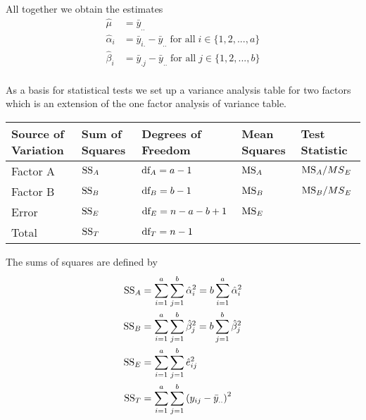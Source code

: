 All together we obtain the estimates
\begin{equation}
  \begin{split}
    \hat{\mu} &= \bar{y}_{..}\\
    \hat{\alpha}_i &= \bar{y}_{i.} - \bar{y}_{..} \;\text{for all}\; i \in \{1, 2, ..., a\}\\
    \hat{\beta}_i &= \bar{y}_{.j} - \bar{y}_{..}  \;\text{for all}\; j \in \{1, 2, ..., b\}\\
  \end{split}
\end{equation}

As a basis for statistical tests we set up a variance analysis table for two factors which is an extension
of the one factor analysis of variance table.
\begin{table}[H]
  \footnotesize
  \centering
  \begin{tabular}{ m{1.5cm} | m{1cm} l m{0.8cm} m{1.2cm}}
      Source of Variation  & Sum of Squares &  Degrees of Freedom & Mean Squares & Test Statistic \\ \hline
      Factor A   & $\textup{SS}_A$ & $\textup{df}_A = a-1$     & $\textup{MS}_A$ & $\textup{MS}_A / {MS}_E$\\
      Factor B   & $\textup{SS}_B$ & $\textup{df}_B = b-1$     & $\textup{MS}_B$ & $\textup{MS}_B / {MS}_E$\\
      Error      & $\textup{SS}_E$ & $\textup{df}_E = n-a-b+1$ & $\textup{MS}_E$ & \\ \hline
      Total      & $\textup{SS}_T$ & $\textup{df}_T = n-1$     &                 &\\
  \end{tabular}
\end{table}
The sums of squares are defined by
\begin{equation}
  \begin{split}
    \textup{SS}_A &= \sum_{i=1}^a \sum_{j=1}^b \hat{\alpha}_i^2 = b \sum_{i=1}^a \hat{\alpha}_i^2\\
    \textup{SS}_B &= \sum_{i=1}^a \sum_{j=1}^b \hat{\beta}_j^2 = b \sum_{j=1}^b \hat{\beta}_j^2\\
    \textup{SS}_E &= \sum_{i=1}^a \sum_{j=1}^b \hat{e}_{ij}^2\\
    \textup{SS}_T &= \sum_{i=1}^a \sum_{j=1}^b \left(y_{ij} - \bar{y}_{..}\right)^2
  \end{split}
\end{equation}

